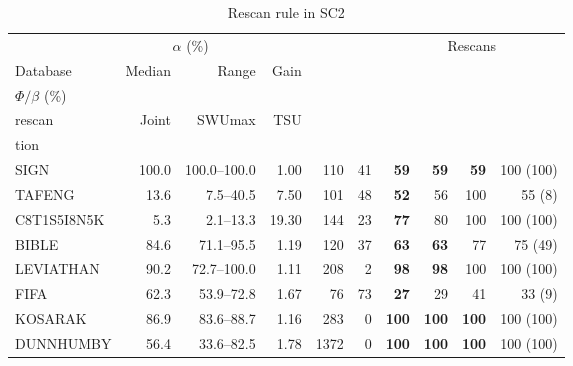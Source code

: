 \begin{table}[!htbp]\centering
\caption{Rescan rule in SC2}\label{tab:sc2_rule}
\setlength{\tabcolsep}{3pt}
\begin{tabular*}{\textwidth}{@{\extracolsep\fill}lrrrrrrrrr}\toprule
 & \multicolumn{2}{c}{$\alpha$ (\%)} & & & & \multicolumn{4}{c}{Rescans} \\\cmidrule(lr){2-3}\cmidrule(l){7-10}
Database & Median & Range & Gain & \begin{tabular}[b]{@{}r@{}}Median\\$\Phi/\beta$ (\%)\end{tabular} & \begin{tabular}[b]{@{}r@{}}No\\rescan\end{tabular} & Joint & SWUmax & TSU & \begin{tabular}[b]{@{}r@{}}Selec-\\tion\end{tabular} \\\midrule
SIGN & 100.0 & 100.0--100.0 & 1.00 & 110 & 41 & \textbf{59} & \textbf{59} & \textbf{59} & 100 (100) \\
TAFENG & 13.6 & 7.5--40.5 & 7.50 & 101 & 48 & \textbf{52} & 56 & 100 & 55 (8) \\
C8T1S5I8N5K & 5.3 & 2.1--13.3 & 19.30 & 144 & 23 & \textbf{77} & 80 & 100 & 100 (100) \\
BIBLE & 84.6 & 71.1--95.5 & 1.19 & 120 & 37 & \textbf{63} & \textbf{63} & 77 & 75 (49) \\
LEVIATHAN & 90.2 & 72.7--100.0 & 1.11 & 208 & 2 & \textbf{98} & \textbf{98} & 100 & 100 (100) \\
FIFA & 62.3 & 53.9--72.8 & 1.67 & 76 & 73 & \textbf{27} & 29 & 41 & 33 (9) \\
KOSARAK & 86.9 & 83.6--88.7 & 1.16 & 283 & 0 & \textbf{100} & \textbf{100} & \textbf{100} & 100 (100) \\
DUNNHUMBY & 56.4 & 33.6--82.5 & 1.78 & 1372 & 0 & \textbf{100} & \textbf{100} & \textbf{100} & 100 (100) \\
\bottomrule\end{tabular*}
\end{table}
